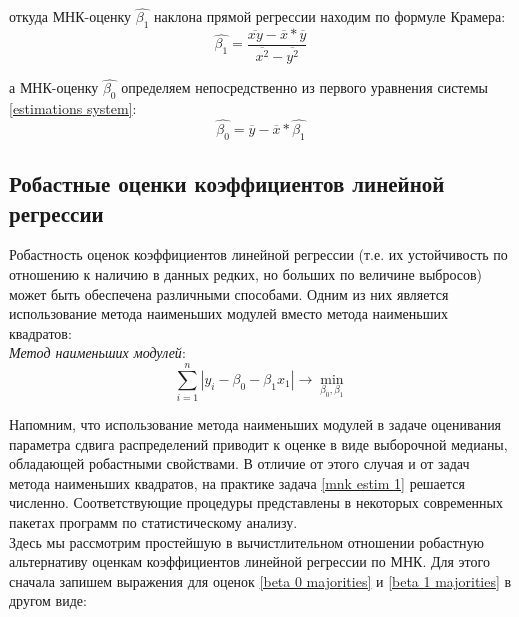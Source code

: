 \documentclass[a4paper]{article}
\begin{document}
        откуда МНК-оценку $\widehat{\beta_1}$ наклона прямой регрессии находим по формуле Крамера: \\
        
        \begin{equation} \label{beta 1 majorities}
            \widehat{\beta_1} = \frac{\overline{xy} - \overline{x} * \overline{y}}{\overline{x^2} - \overline{y^2}}
        \end{equation}
        
        а МНК-оценку $\widehat{\beta_0}$ определяем непосредственно из первого уравнения системы \ref{estimations system}: \\
        
        \begin{equation} \label{beta 0 majorities}
            \widehat{\beta_0} = \overline{y} - \overline{x} * \widehat{\beta_1}
        \end{equation}
        
    \subsection{Робастные оценки коэффициентов линейной регрессии}
    
    Робастность оценок коэффициентов линейной регрессии (т.е. их устойчивость по отношению к наличию в данных редких, но больших по величине выбросов) может быть обеспечена различными способами. Одним из них является использование метода наименьших модулей вместо метода наименьших квадратов: \\
    
    \textit{Метод наименьших модулей}: \\
    
    \begin{equation} \label{mnk estim 1}
        \sum\limits_{i=1}^{n}{|y_i - \beta_0 - \beta_1 x_1|} \rightarrow \min_{\beta_0, \beta_1}
    \end{equation}
    
    Напомним, что использование метода наименьших модулей в задаче оценивания параметра сдвига распределений приводит к оценке в виде выборочной медианы, обладающей робастными свойствами. В отличие от этого случая и от задач метода наименьших квадратов, на практике задача \ref{mnk estim 1} решается численно. Соответствующие процедуры представлены в некоторых современных пакетах программ по статистическому анализу. \\
    
    Здесь мы рассмотрим простейшую в вычистлительном отношении робастную альтернативу оценкам коэффициентов линейной регрессии по МНК. Для этого сначала запишем выражения для оценок \ref{beta 0 majorities} и \ref{beta 1 majorities} в другом виде: \\
    
\end{document}
